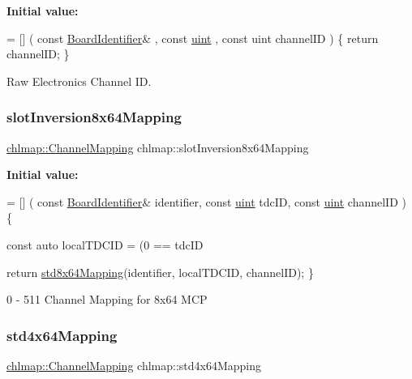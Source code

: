 {\bfseries Initial value\+:}
\begin{DoxyCode}
= [] (
    \textcolor{keyword}{const} \hyperlink{class_board_identifier}{BoardIdentifier}& ,
    \textcolor{keyword}{const} \hyperlink{namespacechlmap_a51093e4e5b1ccf24696e04d671728200}{uint} ,
    \textcolor{keyword}{const} uint channelID
) \{
    \textcolor{keywordflow}{return} channelID;
\}
\end{DoxyCode}


Raw Electronics Channel ID. 

\mbox{\label{namespacechlmap_addbd4a4856137809b06e1bffd39e2897}} 
\subsubsection{\texorpdfstring{slot\+Inversion8x64\+Mapping}{slotInversion8x64Mapping}}
{\footnotesize\ttfamily \hyperlink{namespacechlmap_a5bb86fec567a6f1a0646881a9284bb01}{chlmap\+::\+Channel\+Mapping} chlmap\+::slot\+Inversion8x64\+Mapping}

{\bfseries Initial value\+:}
\begin{DoxyCode}
= [] (
    \textcolor{keyword}{const} \hyperlink{class_board_identifier}{BoardIdentifier}& identifier,
    \textcolor{keyword}{const} \hyperlink{_packet_8cpp_a69aa29b598b851b0640aa225a9e5d61d}{uint} tdcID,
    \textcolor{keyword}{const} \hyperlink{_packet_8cpp_a69aa29b598b851b0640aa225a9e5d61d}{uint} channelID
) \{
    
    \textcolor{keyword}{const} \textcolor{keyword}{auto} localTDCID = (0 == tdcID%

    
    \textcolor{keywordflow}{return} \hyperlink{namespacechlmap_a11d7121de30a32ead9032c59221b7442}{std8x64Mapping}(identifier, localTDCID, channelID);
\}
\end{DoxyCode}


0 -\/ 511 Channel Mapping for 8x64 M\+CP 

\mbox{\label{namespacechlmap_a8acaf58562324b3f691a218f08c7afe4}} 
\subsubsection{\texorpdfstring{std4x64\+Mapping}{std4x64Mapping}}
{\footnotesize\ttfamily \hyperlink{namespacechlmap_a5bb86fec567a6f1a0646881a9284bb01}{chlmap\+::\+Channel\+Mapping} chlmap\+::std4x64\+Mapping}

